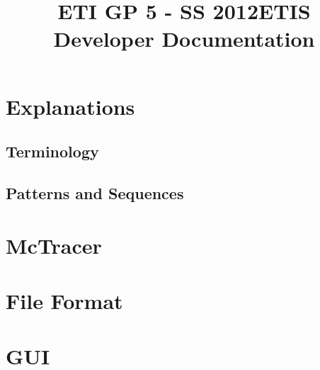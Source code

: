 \documentclass{scrartcl}
\title{ETI GP 5 - SS 2012\newline ETIS Developer Documentation}
\begin{document}
\maketitle
\tableofcontents
\newpage

\section{Explanations}
	\subsection{Terminology} 
	\subsection{Patterns and Sequences} 
\newpage
\section{McTracer} 
\newpage
\section{File Format} 
\newpage
\section{GUI} 
\end{document}
